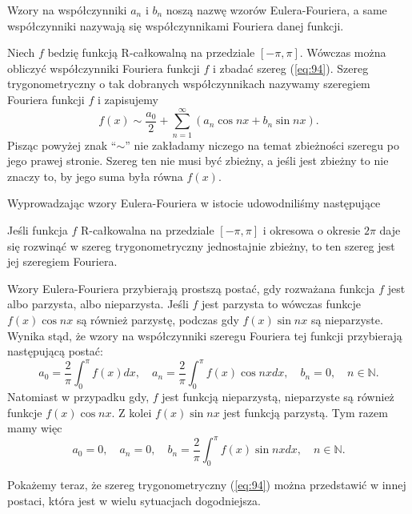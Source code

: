 \documentclass[leqno]{article}
\begin{document}
\begin{justify}
\begin{defn}
    Wzory na współczynniki $a_n$ i $b_n$ noszą nazwę wzorów Eulera-Fouriera, a same współczynniki nazywają się
    współczynnikami Fouriera danej funkcji.
\end{defn}

\begin{defn}
    Niech $f$ bedzię funkcją R-całkowalną na przedziale $[-\pi, \pi]$. Wówczas można obliczyć współczynniki Fouriera funkcji $f$ i zbadać szereg (\ref{eq:94}).
    Szereg trygonometryczny o tak dobranych współczynnikach nazywamy szeregiem Fouriera funkcji $f$ i zapisujemy 
    \[
        f(x) \sim \frac{a_0}{2} + \sum_{n=1}^{\infty}(a_n \cos nx + b_n \sin nx).
    \]
    Pisząc powyżej znak ``$\sim$'' nie zakładamy niczego na temat zbieżności szeregu po jego prawej stronie. Szereg ten nie musi być zbieżny, a jeśli jest zbieżny to nie znaczy to, 
    by jego suma była równa $f(x)$.
\end{defn}


Wyprowadzając wzory Eulera-Fouriera w istocie udowodniliśmy następujące

\begin{theorem}
{
    Jeśli funkcja $f$ R-całkowalna na przedziale $[-\pi, \pi]$ i okresowa o okresie $2\pi$ daje się rozwinąć w szereg trygonometryczny jednostajnie zbieżny,
    to ten szereg jest jej szeregiem Fouriera.
}
\end{theorem}

\begin{uwaga}
    Wzory Eulera-Fouriera przybierają prostszą postać, gdy rozważana funkcja $f$ jest albo parzysta, albo nieparzysta.
    Jeśli $f$ jest parzysta to wówczas funkcje $f(x)\cos nx$ są również parzystę, podczas gdy $f(x) \sin nx$ są nieparzyste.
    Wynika stąd, że wzory na współczynniki szeregu Fouriera tej funkcji przybierają następującą postać:
    \[
        a_0 = \frac{2}{\pi}\int_{0}^{\pi}f(x)dx, \quad
        a_n = \frac{2}{\pi}\int_{0}^{\pi}f(x) \cos nx dx, \quad
        b_n = 0, \quad n \in \mathbb{N}.
    \]
    Natomiast w przypadku gdy, $f$ jest funkcją nieparzystą, nieparzyste są również funkcje $f(x) \cos nx$. Z kolei $f(x) \sin nx$ jest funkcją parzystą. 
    Tym razem mamy więc
    \[
        a_0 = 0, \quad a_n = 0, \quad b_n = \frac{2}{\pi}\int_{0}^{\pi}f(x) \sin nx dx, \quad n \in \mathbb{N}.
    \]
\end{uwaga}

Pokażemy teraz, że szereg trygonometryczny (\ref{eq:94}) można przedstawić w innej postaci, która jest w wielu sytuacjach dogodniejsza.


\end{justify}
\end{document}
